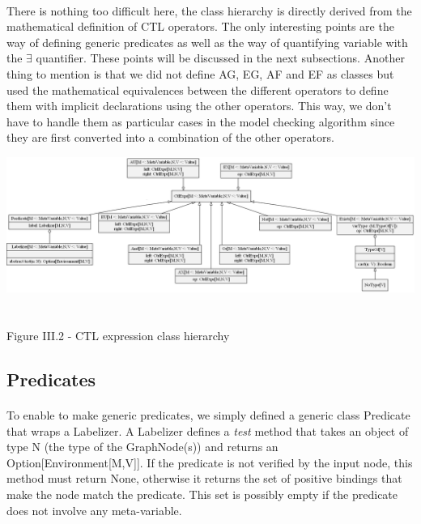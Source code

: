 \documentclass{report}
\begin{document}
\paragraph{}
\hspace{4mm}There is nothing too difficult here, the class hierarchy is directly derived from the mathematical
definition of CTL operators. The only interesting points are the way of defining generic predicates as well as the way of quantifying variable with the $\exists$ quantifier. These points
will be discussed in the next subsections. Another thing to mention is that we did not define AG, EG, AF and EF as classes but used the mathematical equivalences between the different operators
to define them with implicit declarations using the other operators. This way, we don't have to handle them as particular cases in the model checking algorithm since they are first converted into
a combination of the other operators.

\begin{center}
\includegraphics[scale=0.4]{data/CTL_expr.png}
~\\~\\Figure III.2 - CTL expression class hierarchy
\end{center}

\subsection{Predicates}

\paragraph{}
\hspace{4mm}To enable to make generic predicates, we simply defined a generic class Predicate that wraps a Labelizer. A Labelizer
defines a \textit{test} method that takes an object of type N (the type of the GraphNode(s)) and returns an Option[Environment[M,V]].
If the predicate is not verified by the input node, this method must return None, otherwise it returns the set of positive bindings that make the node
match the predicate. This set is possibly empty if the predicate does not involve any meta-variable.
\end{document}
